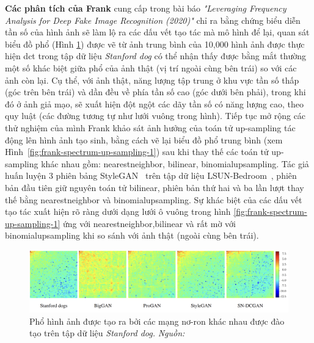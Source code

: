 \textbf{Các phân tích của Frank}\cite{Frank2020LeveragingFA} cung cấp trong bài báo \textit{"Leveraging Frequency Analysis for Deep Fake Image Recognition (2020)"} chỉ ra bằng chứng biểu diễn tần số của hình ảnh sẽ làm lộ ra các dấu vết tạo tác mà mô hình để lại, quan sát biểu đồ phổ (Hình \ref{fig:dct-spectra-1}) được vẽ từ ảnh trung bình của 10,000 hình ảnh được thực hiện \gls{dct} trong tập dữ liệu \textit{Stanford dog} có thể nhận thấy được bằng mắt thường một số khác biệt giữa phổ của ảnh thật (vị trí ngoài cùng bên trái) so với các ảnh còn lại. Cụ thể, với ảnh thật, năng lượng tập trung ở khu vực tần số thấp (góc trên bên trái) và dần đều về phía tần số cao (góc dưới bên phải), trong khi đó ở ảnh giả mạo, sẽ xuất hiện đột ngột các dãy tần số có năng lượng cao, theo quy luật (các đường tương tự như lưới vuông trong hình). Tiếp tục mở rộng các thử nghiệm của mình Frank khảo sát ảnh hưởng của toán tử \gls{up-sampling} tác động lên hình ảnh tạo sinh, bằng cách vẽ lại biểu đồ phổ trung bình (xem Hình~\ref{fig:frank-spectrum-up-sampling-1}) sau khi thay thế các toán tử \gls{up-sampling} khác nhau gồm: \gls{nearestneighbor}, \gls{bilinear}, \gls{binomialupsampling}. Tác giả huấn luyện 3 phiên bảng StyleGAN~\cite{karras2019style} trên tập dữ liệu LSUN-Bedroom~\cite{Yu2015LSUNCO}, phiên bản đầu tiên giữ nguyên toán tử \gls{bilinear}, phiên bản thứ hai và ba lần lượt thay thế bằng \gls{nearestneighbor} và \gls{binomialupsampling}.
Sự khác biệt của các dấu vết tạo tác xuất hiện rõ ràng dưới dạng lưới ô vuông trong hình \ref{fig:frank-spectrum-up-sampling-1} ứng với \gls{nearestneighbor},\gls{bilinear} và rất mờ với \gls{binomialupsampling} khi so sánh với ảnh thật (ngoài cùng bên trái).
%
\begin{figure}[ht!]
	\centering
	\includegraphics[width=1.0\linewidth]{Images/Stanford-dog-data-set-DCT-spectra.png}
	\begin{minipage}{0.9\linewidth}
		\caption{Phổ hình ảnh được tạo ra bởi các mạng nơ-ron khác nhau được đào tạo trên tập dữ liệu \textit{Stanford dog.} \textit{Nguồn: \cite{Frank2020LeveragingFA}}}
		\label{fig:dct-spectra-1}
	\end{minipage}
\end{figure}
%
